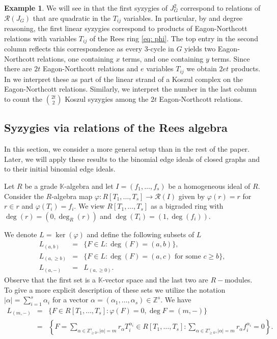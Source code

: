 \documentclass[reqno]{amsart}
\theoremstyle{definition}
\newtheorem{ex}[thm]{Example}
\theoremstyle{remark}
\numberwithin{equation}{section}
\newcommand{\R}{\ensuremath{\mathcal{R}}}
\begin{document}
\begin{ex}
We will see in  that the first syzygies of  $J_G^2$  correspond to relations of $\mathcal R(J_G)$ that are quadratic in the $T_{ij}$ variables. In particular, by  and degree reasoning, the first linear syzygies correspond to products of Eagon-Northcott relations with  variables $T_{ij}$ of the Rees ring \eqref{eq: phi}. The top entry in the second column reflects this correspondence as every $3$-cycle in $G$ yields two Eagon-Northcott relations, one containing $x$ terms, and one containing $y$ terms. Since there are $2t$ Eagon-Northcott relations and $e$ variables $T_{ij}$ we obtain $2et$ products. In  we interpret these as part of the linear strand of a Koszul complex on the Eagon-Northcott relations. Similarly, we interpret the number in the last column to count the $\binom{2t}{2}$ Koszul syzygies among the $2t$ Eagon-Northcott relations.
\end{ex}


\subsection{Syzygies via relations of the Rees algebra}
In this section, we consider a more general setup than in the rest of the paper. Later, we will apply these results to the binomial edge ideals of closed graphs and to their initial binomial edge ideals. 

Let $R$ be a grade $\mathbb{K}$-algebra and let $I = (f_1, \ldots, f_s)$ be a homogeneous ideal
of $R$. Consider the $R$-algebra map $\varphi: R[T_1, \ldots, T_s] \to \R(I)$ given by $\varphi(r)=r$ for $r\in r$ and $\varphi(T_i)=f_i$. We view $R[T_1, \ldots, T_s]$ as a bigraded ring with $\deg(r)=(0,\deg_R(r))$ and $\deg(T_i)=(1,\deg(f_i))$.


We denote \(L=\ker(\varphi)\) and define the following subsets of \(L\)
\begin{eqnarray*}
L_{(a,b)} &=&\{F\in L: \deg(F)=(a,b)\},\\
L_{(a,\geq b)} &=&\{F\in L: \deg(F)=(a,c) \text{ for some } c\geq b\},\\
L_{(a,-)} &=& L_{(a, \geq 0)}.
\end{eqnarray*}
Observe that the first set is a \(\mathbb{K}\)-vector space and the last two are  \(R-\)modules. 
To give a more explicit description of these sets we utilize the notation $|\alpha|=\sum_{i=1}^s \alpha_i$ for a vector $\alpha=(\alpha_1, \ldots, \alpha_s)\in \mathbb{Z}^s$. 
We have
\begin{eqnarray}
L_{(m,-)}    & =&\{F\in R[T_1, \ldots, T_s]:\varphi(F)=0, \deg{F}=(m,-)\} \nonumber\\
    & = &\left\{F=\sum_{\alpha\in\mathbb{Z}_{\geq 0}^s, |\alpha|=m} r_\alpha T_{i}^{\alpha_{i}}\in R[T_1,\ldots, T_s] : \sum_{\alpha\in\mathbb{Z}_{\geq 0}^s, |\alpha|=m}r_\alpha f_{i}^{\alpha_{i}}=0\right\}. \label{eq: L}
\end{eqnarray}
\end{document}
